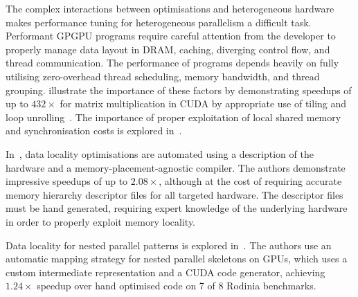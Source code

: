 \documentclass[nonatbib,preprint,10pt]{sigplanconf}
\begin{document}



The complex interactions between optimisations and heterogeneous
hardware makes performance tuning for heterogeneous parallelism a
difficult task. Performant GPGPU programs require careful attention
from the developer to properly manage data layout in DRAM, caching,
diverging control flow, and thread communication. The performance of
programs depends heavily on fully utilising zero-overhead thread
scheduling, memory bandwidth, and thread
grouping. \citeauthor{Ryoo2008a} illustrate the importance of these
factors by demonstrating speedups of up to $432\times$ for matrix
multiplication in CUDA by appropriate use of tiling and loop
unrolling~\cite{Ryoo2008a}. The importance of proper exploitation of
local shared memory and synchronisation costs is explored
in~\cite{Lee2010}.

In~\cite{Chen2014}, data locality optimisations are automated using a
description of the hardware and a memory-placement-agnostic
compiler. The authors demonstrate impressive speedups of up to
$2.08\times$, although at the cost of requiring accurate memory
hierarchy descriptor files for all targeted hardware. The descriptor
files must be hand generated, requiring expert knowledge of the
underlying hardware in order to properly exploit memory locality.

Data locality for nested parallel patterns is explored in~\cite{Lee}.
The authors use an automatic mapping strategy for nested parallel
skeletons on GPUs, which uses a custom intermediate representation and
a CUDA code generator, achieving $1.24\times$ speedup over hand
optimised code on 7 of 8 Rodinia benchmarks.
\end{document}
